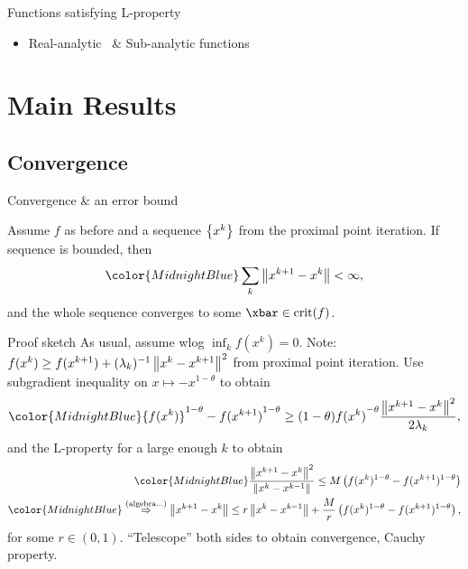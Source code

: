 \documentclass[usenames, dvipsnames, 10pt]{beamer}
\theoremstyle{definition}
\begin{document}
\begin{frame}{Functions satisfying L-property}
    \begin{itemize}
    \item Real-analytic~\citep{Loja63} \& Sub-analytic
    functions~\citep{BolDanLew07}
    \end{itemize}
\end{frame}

\section{Main Results}
\subsection{Convergence}
\begin{frame}{Convergence \& an error bound}
    \begin{block}{\cite[Theorem 1]{AttBol09}} \vspace{1pt}
        Assume $f$ as before and a sequence $\left\{ x^k \right\}$ from the proximal point
        iteration. If sequence is bounded, then
        \[	\color{MidnightBlue}
            \sum_k \norm{x^{k+1} - x^k} < \infty,
        \]
        and the whole sequence converges to some $\xbar \in \mathrm{crit}(f)$.
    \end{block}
\end{frame}
\begin{frame}{Proof sketch}
    As usual, assume wlog $\inf_k f(x^k) = 0$.
    Note: $f(x^k) \geq f(x^{k+1}) + (\lambda_k)^{-1} \left \| x^k - x^{k+1} \right \|^2$
    from proximal point iteration. Use subgradient inequality on $x \mapsto
    -x^{1-\theta}$ to obtain
    \begin{align*}
        \color{MidnightBlue}
        {f(x^k)}^{1-\theta} - {f(x^{k+1})}^{1-\theta} \geq (1 - \theta)
        {f(x^k)}^{-\theta}
            \frac{\norm{x^{k+1} - x^k}^2}{2 \lambda_k},
    \end{align*}
    and the L-property for a large enough $k$ to obtain
    \begin{align*}
        \color{MidnightBlue}
        \frac{\norm{x^{k+1} - x^k}^2}{\norm{x^k - x^{k-1}}}
        \leq M \left(f(x^k)^{1-\theta} - f(x^{k+1})^{1-\theta}\right) \\
        \color{MidnightBlue}
        \overset{(\text{algebra...})}{\Rightarrow}
        \norm{x^{k+1} - x^k} \leq r \norm{x^k - x^{k-1}}
        + \frac{M}{r} \left(f(x^k)^{1-\theta} - f(x^{k+1})^{1-\theta}\right),
    \end{align*}
    for some $r \in (0, 1)$. ``Telescope'' both sides to obtain convergence,
    Cauchy property.
\end{frame}
\end{document}
